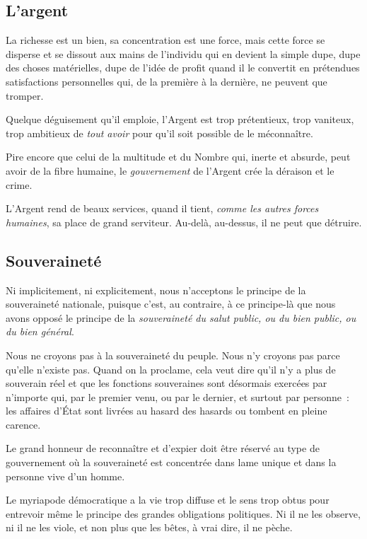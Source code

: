 \documentclass[french,twoside]{book} %
\newcommand{\astermono}{\medskip\centerline{\color{rubric}\large\selectfont{\syms ✻}}\medskip\par}%
\begin{document}
\astermono

\subsection[L’argent]{L’argent}
\noindent La richesse est un bien, sa concentration est une force, mais cette force se disperse et se dissout aux mains de l’individu qui en devient la simple dupe, dupe des choses matérielles, dupe de l’idée de profit quand il le convertit en prétendues satisfactions personnelles qui, de la première à la dernière, ne peuvent que tromper.\par
Quelque déguisement qu’il emploie, l’Argent est trop prétentieux, trop vaniteux, trop ambitieux de \emph{tout avoir} pour qu’il soit possible de le méconnaître.\par
Pire encore que celui de la multitude et du Nombre qui, inerte et absurde, peut avoir de la fibre humaine, le \emph{gouvernement} de l’Argent crée la déraison et le crime.\par
L’Argent rend de beaux services, quand il tient, \emph{comme les autres forces humaines}, sa place de grand serviteur. Au-delà, au-dessus, il ne peut que détruire.\par

\astermono

\subsection[Souveraineté]{Souveraineté}
\noindent Ni implicitement, ni explicitement, nous n’acceptons le principe de la souveraineté nationale, puisque c’est, au contraire, à ce principe-là que nous avons opposé le principe de la\emph{ souveraineté du salut public, ou du bien public, ou du bien général}.\par

\astermono

\noindent Nous ne croyons pas à la souveraineté du peuple. Nous n’y croyons pas parce qu’elle n’existe pas. Quand on la proclame, cela veut dire qu’il n’y a plus de souverain réel et que les fonctions souveraines sont désormais exercées par n’importe qui, par le premier venu, ou par le dernier, et surtout par personne : les affaires d’État sont livrées au hasard des hasards ou tombent en pleine carence.\par

\astermono

\noindent Le grand honneur de reconnaître et d’expier doit être réservé au type de gouvernement où la souveraineté est concentrée dans lame unique et dans la personne vive d’un homme.\par
Le myriapode démocratique a la vie trop diffuse et le sens trop obtus pour entrevoir même le principe des grandes obligations politiques. Ni il ne les observe, ni il ne les viole, et non plus que les bêtes, à vrai dire, il ne pèche.\par
\end{document}
